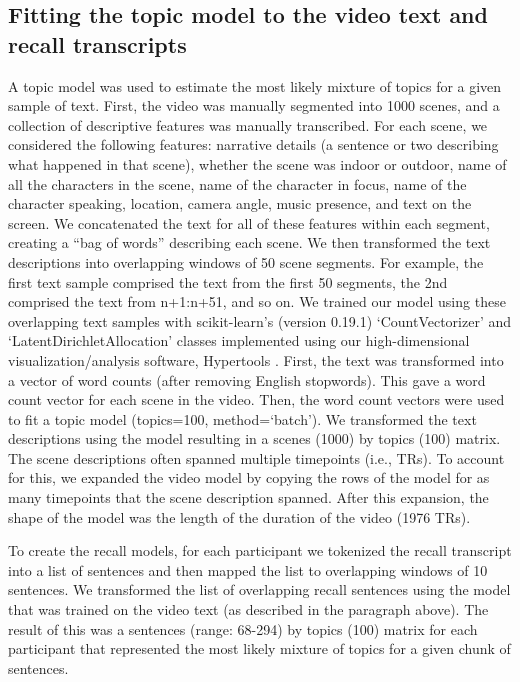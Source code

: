 \documentclass{article}
\begin{document}
\subsection*{Fitting the topic model to the video text and recall transcripts}
A topic model was used to estimate the most likely mixture of topics for a given sample of text. First, the video was manually segmented into 1000 scenes, and a collection of descriptive features was manually transcribed. For each scene, we considered the following features: narrative details (a sentence or two describing what happened in that scene), whether the scene was indoor or outdoor, name of all the characters in the scene, name of the character in focus, name of the character speaking, location, camera angle, music presence, and text on the screen. We concatenated the text for all of these features within each segment, creating a ``bag of words'' describing each scene. We then transformed the text descriptions into overlapping windows of 50 scene segments. For example, the first text sample comprised the text from the first 50 segments, the 2nd comprised the text from n+1:n+51, and so on. We trained our model using these overlapping text samples with scikit-learn's (version 0.19.1) `CountVectorizer' and `LatentDirichletAllocation' classes \citep{PedrEtal11} implemented using our high-dimensional visualization/analysis software, Hypertools \citep{HeusEtal18}.  First, the text was transformed into a vector of word counts (after removing English stopwords). This gave a word count vector for each scene in the video.  Then, the word count vectors were used to fit a topic model (topics=100, method=`batch'). We transformed the text descriptions using the model resulting in a scenes (1000) by topics (100) matrix. The scene descriptions often spanned multiple timepoints (i.e., TRs). To account for this, we expanded the video model by copying the rows of the model for as many timepoints that the scene description spanned. After this expansion, the shape of the model was the length of the duration of the video (1976 TRs).

To create the recall models, for each participant we tokenized the recall transcript into a list of sentences and then mapped the list to overlapping windows of 10 sentences.  We transformed the list of overlapping recall sentences using the model that was trained on the video text (as described in the paragraph above). The result of this was a sentences (range: 68-294) by topics (100) matrix for each participant that represented the most likely mixture of topics for a given chunk of sentences.
\end{document}
